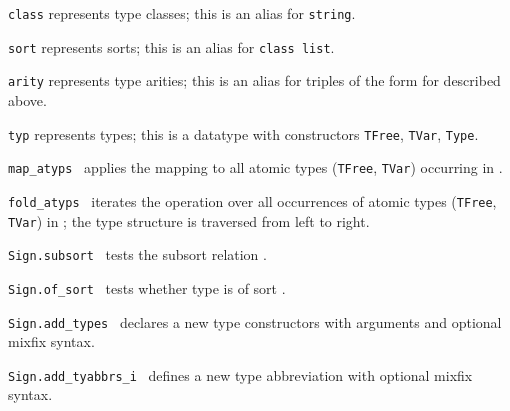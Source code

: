 \begin{isabellebody}
\begin{isamarkuptext}
  \begin{description}

  \item \verb|class| represents type classes; this is an alias for
  \verb|string|.

  \item \verb|sort| represents sorts; this is an alias for
  \verb|class list|.

  \item \verb|arity| represents type arities; this is an alias for
  triples of the form  for  described above.

  \item \verb|typ| represents types; this is a datatype with
  constructors \verb|TFree|, \verb|TVar|, \verb|Type|.

  \item \verb|map_atyps|~ applies the mapping 
  to all atomic types (\verb|TFree|, \verb|TVar|) occurring in \isa{{\isasymtau}}.

  \item \verb|fold_atyps|~ iterates the operation  over all occurrences of atomic types (\verb|TFree|, \verb|TVar|)
  in \isa{{\isasymtau}}; the type structure is traversed from left to right.

  \item \verb|Sign.subsort|~
  tests the subsort relation .

  \item \verb|Sign.of_sort|~ tests whether type
  \isa{{\isasymtau}} is of sort .

  \item \verb|Sign.add_types|~ declares a new
  type constructors \isa{{\isasymkappa}} with  arguments and
  optional mixfix syntax.

  \item \verb|Sign.add_tyabbrs_i|~
  defines a new type abbreviation \isa{{\isacharparenleft}\isactrlvec {\isasymalpha}{\isacharparenright}{\isasymkappa}\ {\isacharequal}\ {\isasymtau}} with
  optional mixfix syntax.


\end{description}
\end{isamarkuptext}
\end{isabellebody}
